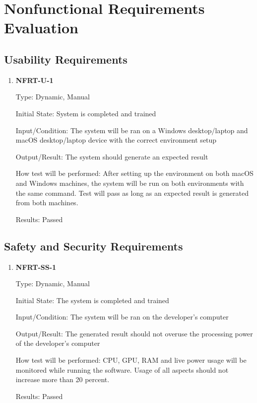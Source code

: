 \documentclass[12pt, titlepage]{article}
\begin{document}
\section{Nonfunctional Requirements Evaluation}


\subsection{Usability Requirements}


\begin{enumerate}


\item \textbf{NFRT-U-1}
  
Type: Dynamic, Manual
            
Initial State: System is completed and trained
            
Input/Condition: The system will be ran on a Windows desktop/laptop and macOS desktop/laptop device with the correct environment setup
            
Output/Result: The system should generate an expected result
            
How test will be performed: After setting up the environment on both macOS and Windows machines, the system will be run on both environments with the same command. Test will pass as long as an expected result is generated from both machines.


Results: Passed
  
\end{enumerate}
  
\subsection{Safety and Security Requirements}


\begin{enumerate}


\item \textbf{NFRT-SS-1}


Type: Dynamic, Manual
        
Initial State: The system is completed and trained
        
Input/Condition: The system will be ran on the developer's computer
        
Output/Result: The generated result should not overuse the processing power of the developer's computer
        
How test will be performed: CPU, GPU, RAM and live power usage will be monitored while running the software. Usage of all aspects should not increase more than 20 percent.  


Results: Passed
        
\end{enumerate}
\end{document}
